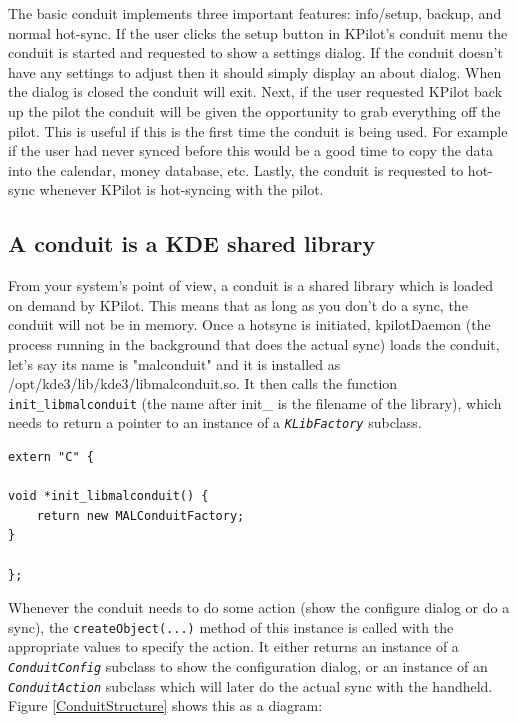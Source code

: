 \documentclass[10pt,a4paper]{article}
\newcommand{\code}[1]{{\small\texttt{#1}}}
\newcommand{\class}[1]{{\small\em\texttt{#1}}}
\begin{document}
    The basic conduit implements three important features:
info/setup, backup, and normal hot-sync.  If the user clicks the setup 
button in KPilot's conduit menu the conduit is started and requested
to show a settings dialog.  If the conduit doesn't have any settings
to adjust then it should simply display an about dialog.  When the
dialog is closed the conduit will exit.  Next, if the user requested
KPilot back up the pilot the conduit will be given the opportunity to
grab everything off the pilot.  This is useful if this is the first
time the conduit is being used.  For example if the user had never
synced before this would be a good time to copy the data into the
calendar, money database, etc.  Lastly, the conduit is requested to
hot-sync whenever KPilot is hot-syncing with the pilot. 



\subsection{A conduit is a KDE shared library}

From your system's point of view, a conduit is a shared library which is loaded 
on demand by KPilot. This means that as long as you don't do a sync, the conduit will not 
be in memory. Once a hotsync is initiated, kpilotDaemon (the process running in 
the background that does the actual sync) loads the conduit, let's say its name 
is "malconduit" and it is installed as /opt/kde3/lib/kde3/libmalconduit.so. It 
then calls the function \code{init\_libmalconduit} (the name after init\_ is the 
filename of the library), which needs to return a pointer to an instance 
of a \class{KLibFactory} subclass. 

{\small\begin{verbatim}
extern "C" {

void *init_libmalconduit() {
    return new MALConduitFactory;
}

};
\end{verbatim}
}

Whenever the conduit needs to do some action 
(show the configure dialog or do a sync), the \code{createObject(...)} method 
of this instance is called with the appropriate values to specify the action. It either returns an instance 
of a \class{ConduitConfig} subclass to show the configuration dialog, or an 
instance of an \class{ConduitAction} subclass which will later do the actual sync 
with the handheld. Figure \ref{ConduitStructure} shows this as a diagram:
\end{document}
